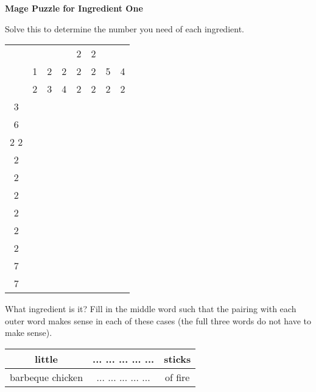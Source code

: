 \documentclass[white]{guildcamp3}
\begin{document}
\name{\wMagePuzzleOne{}} %

\large\textbf{Mage Puzzle for Ingredient One}  

Solve this to determine the number you need of each ingredient. 


\begin{tabular}{|c|c|c|c|c|c|c|c|}
	\hline \rule[-2ex]{0pt}{5.5ex}  &  &  &  & 2 & 2 &  &  \\ 
	  & 1 & 2 & 2 & 2 & 2 & 5 & 4 \\ 
      & 2 & 3 & 4 & 2 & 2 & 2 & 2 \\ 
	\hline \rule[-2ex]{0pt}{5.5ex} 3 &  &  &  &  &  &  &  \\ 
	\hline \rule[-2ex]{0pt}{5.5ex} 6 &  &  &  &  &  &  &  \\ 
	\hline \rule[-2ex]{0pt}{5.5ex} 2 2 &  &  &  &  &  &  &  \\ 
	\hline \rule[-2ex]{0pt}{5.5ex} 2 &  &  &  &  &  &  &  \\ 
	\hline \rule[-2ex]{0pt}{5.5ex} 2 &  &  &  &  &  &  &  \\ 
	\hline \rule[-2ex]{0pt}{5.5ex} 2 &  &  &  &  &  &  &  \\ 
	\hline \rule[-2ex]{0pt}{5.5ex} 2 &  &  &  &  &  &  &  \\ 
	\hline \rule[-2ex]{0pt}{5.5ex} 2 &  &  &  &  &  &  &  \\ 
	\hline \rule[-2ex]{0pt}{5.5ex} 2 &  &  &  &  &  &  &  \\ 
	\hline \rule[-2ex]{0pt}{5.5ex} 7 &  &  &  &  &  &  &  \\ 
	\hline \rule[-2ex]{0pt}{5.5ex} 7 &  &  &  &  &  &  &  \\ 
	\hline 
\end{tabular} 

What ingredient is it? Fill in the middle word such that the pairing with each outer word makes sense in each of these cases (the full three words do not have to make sense).

\begin{tabular}{|c|c|c|}
	\hline \rule[-2ex]{0pt}{5.5ex} little & ... ... ... ... ... & sticks \\ 
	\hline \rule[-2ex]{0pt}{5.5ex} barbeque chicken & ... ... ... ... ... & of fire \\ 
	\hline 
\end{tabular} 
\end{document}
